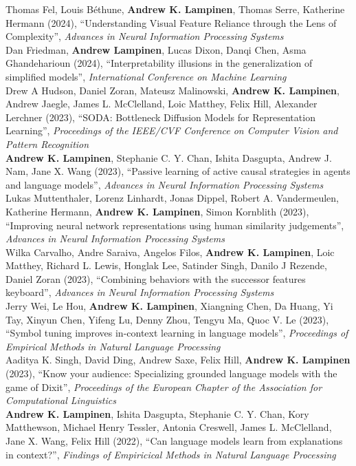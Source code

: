 \documentclass[margin]{res}
\begin{document}
\begin{resume}
Thomas Fel, Louis B{\'e}thune, \textbf{Andrew K. Lampinen}, Thomas Serre,  Katherine Hermann (2024), {``Understanding Visual Feature Reliance through the Lens of Complexity'',} \textit{Advances in Neural Information Processing Systems} \\[3pt]
Dan Friedman, \textbf{Andrew Lampinen}, Lucas Dixon, Danqi Chen, Asma Ghandeharioun (2024), {``Interpretability illusions in the generalization of simplified models'',} \textit{International Conference on Machine Learning} \\[3pt]
Drew A Hudson, Daniel Zoran, Mateusz Malinowski, \textbf{Andrew K. Lampinen}, Andrew Jaegle, James L. McClelland, Loic Matthey, Felix Hill, Alexander Lerchner (2023), {``SODA: Bottleneck Diffusion Models for Representation Learning''}, \textit{Proceedings of the IEEE/CVF Conference on Computer Vision and Pattern Recognition} \\[3pt]
\textbf{Andrew K. Lampinen}, Stephanie C. Y. Chan, Ishita Dasgupta, Andrew J. Nam, Jane X. Wang (2023), {``Passive learning of active causal strategies in agents and language models'',} \textit{Advances in Neural Information Processing Systems} \\[3pt]
Lukas Muttenthaler, Lorenz Linhardt, Jonas Dippel, Robert A. Vandermeulen, Katherine Hermann, \textbf{Andrew K. Lampinen}, Simon Kornblith (2023), {``Improving neural network representations using human similarity judgements'',} \textit{Advances in Neural Information Processing Systems} \\[3pt]
Wilka Carvalho, Andre Saraiva, Angelos Filos, \textbf{Andrew K. Lampinen}, Loic Matthey, Richard L. Lewis, Honglak Lee, Satinder Singh, Danilo J Rezende, Daniel Zoran (2023), {``Combining behaviors with the successor features keyboard''}, \textit{Advances in Neural Information Processing Systems} \\[3pt]
Jerry Wei, Le Hou, \textbf{Andrew K. Lampinen}, Xiangning Chen, Da Huang, Yi Tay, Xinyun Chen, Yifeng Lu, Denny Zhou, Tengyu Ma, Quoc V. Le (2023), {``Symbol tuning improves in-context learning in language models'',} \textit{Proceedings of Empirical Methods in Natural Language Processing} \\[3pt]
Aaditya K. Singh, David Ding, Andrew Saxe, Felix Hill, \textbf{Andrew K. Lampinen} (2023), {``Know your audience: Specializing grounded language models with the game of Dixit'',} \textit{Proceedings of the European Chapter of the Association for Computational Linguistics} \\[3pt]
\textbf{Andrew K. Lampinen}, Ishita Dasgupta, Stephanie C. Y. Chan, Kory Matthewson, Michael Henry Tessler, Antonia Creswell, James L. McClelland, Jane X. Wang, Felix Hill (2022), {``Can language models learn from explanations in context?'',} \textit{Findings of Empiricical Methods in Natural Language Processing} \\[3pt] 

\end{resume}
\end{document}
